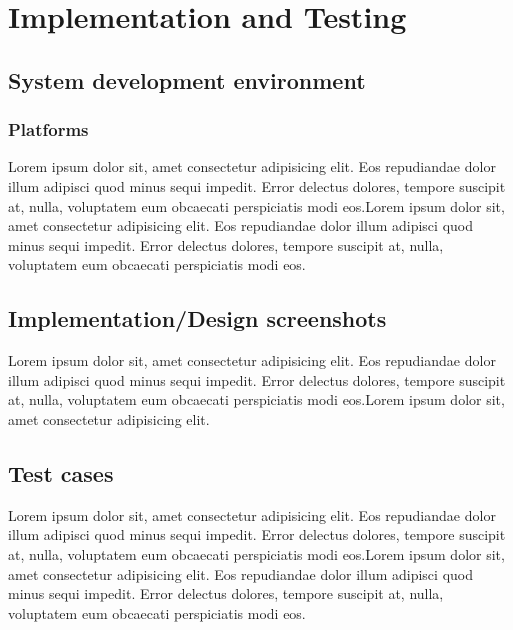 \chapter{Implementation and Testing}\label{Implementation and Testing}
\section{System development environment}

\subsection{Platforms}
Lorem ipsum dolor sit, amet consectetur adipisicing elit. Eos repudiandae dolor illum adipisci quod minus sequi impedit. Error delectus dolores, tempore suscipit at, nulla, voluptatem eum obcaecati perspiciatis modi eos.Lorem ipsum dolor sit, amet consectetur adipisicing elit. Eos repudiandae dolor illum adipisci quod minus sequi impedit. Error delectus dolores, tempore suscipit at, nulla, voluptatem eum obcaecati perspiciatis modi eos.

\section{Implementation/Design screenshots}

Lorem ipsum dolor sit, amet consectetur adipisicing elit. Eos repudiandae dolor illum adipisci quod minus sequi impedit. Error delectus dolores, tempore suscipit at, nulla, voluptatem eum obcaecati perspiciatis modi eos.Lorem ipsum dolor sit, amet consectetur adipisicing elit.
\section{Test cases}

Lorem ipsum dolor sit, amet consectetur adipisicing elit. Eos repudiandae dolor illum adipisci quod minus sequi impedit. Error delectus dolores, tempore suscipit at, nulla, voluptatem eum obcaecati perspiciatis modi eos.Lorem ipsum dolor sit, amet consectetur adipisicing elit. Eos repudiandae dolor illum adipisci quod minus sequi impedit. Error delectus dolores, tempore suscipit at, nulla, voluptatem eum obcaecati perspiciatis modi eos.
